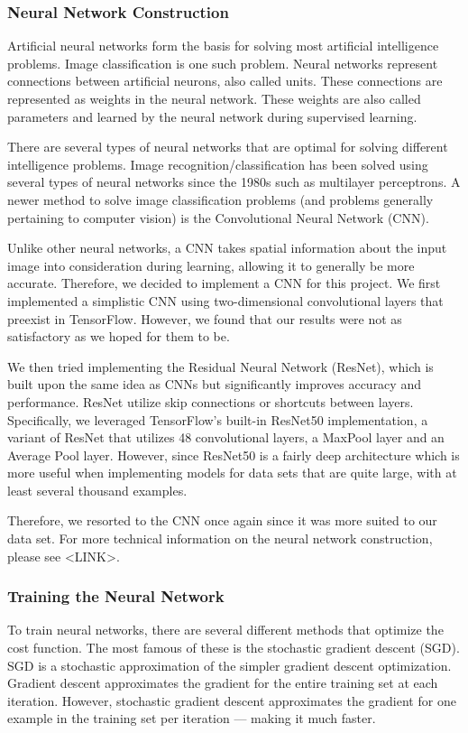 \documentclass[11pt]{article}
\begin{document}
  \subsubsection{Neural Network Construction}
  Artificial neural networks form the basis for solving most artificial intelligence 
  problems. Image classification is one such problem. Neural networks represent connections 
  between artificial neurons, also called units. These connections are represented as weights 
  in the neural network. These weights are also called parameters and 
  learned by the neural network during supervised learning.

  There are several types of neural networks that are optimal for solving different 
  intelligence problems. Image recognition/classification has been solved using 
  several types of neural networks since the 1980s such as multilayer perceptrons. 
  A newer method to solve image classification problems (and problems generally 
  pertaining to computer vision) is the Convolutional Neural Network (CNN). 
  
  Unlike other neural networks, a CNN takes spatial information about the input image 
  into consideration during learning, allowing it to generally be more accurate. Therefore, 
  we decided to implement a CNN for this project. We first implemented a simplistic 
  CNN using two-dimensional convolutional layers that preexist in TensorFlow. However, 
  we found that our results were not as satisfactory as we hoped for them to be.

  We then tried implementing the Residual Neural Network (ResNet), which is built
  upon the same idea as CNNs but significantly improves accuracy and performance. 
  ResNet utilize skip connections or shortcuts between layers. Specifically, we leveraged 
  TensorFlow's built-in ResNet50 implementation, a variant of ResNet that utilizes 
  48 convolutional layers, a MaxPool layer and an Average Pool layer. However, since 
  ResNet50 is a fairly deep architecture which is more useful when implementing models 
  for data sets that are quite large, with at least several thousand examples.

  Therefore, we resorted to the CNN once again since it was more suited to 
  our data set.
  For more technical information on the neural network construction, please see <LINK>.
  
  \subsubsection{Training the Neural Network}
  To train neural networks, there are several different methods that optimize 
  the cost function. The most famous of these is the stochastic gradient descent (SGD). 
  SGD is a stochastic approximation of the simpler gradient descent optimization. Gradient 
  descent approximates the gradient for the entire training set at each iteration. However, 
  stochastic gradient descent approximates the gradient for one example in the training set 
  per iteration --- making it much faster. 
\end{document}
